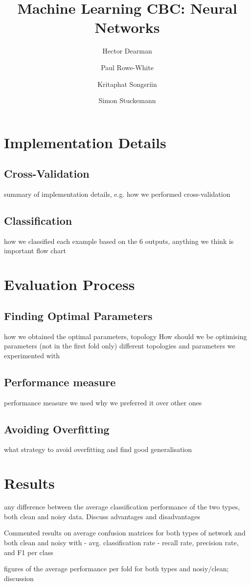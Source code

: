 \documentclass[10pt,a4paper]{article}
\author{Hector Dearman \and Paul Rowe-White \and Kritaphat Songsriin \and Simon Stuckemann}
\title{Machine Learning CBC: Neural Networks}
\begin{document}
\maketitle
\section{Implementation Details}
\subsection{Cross-Validation}
summary of implementation details, e.g. how we performed cross-validation
\subsection{Classification}
how we classified each example based on the 6 outputs, anything we think is important
flow chart

\section{Evaluation Process}

\subsection{Finding Optimal Parameters}
how we obtained the optimal parameters, topology
How should we be optimising parameters (not in the first fold only)
different topologies and parameters we experimented with
\subsection{Performance measure}
performance measure we used why we preferred it over other ones
\subsection{Avoiding Overfitting}
what strategy to avoid overfitting and find good generalisation

\section{Results}

any difference between the average classification performance of the two types, both clean and noisy data. Discuss advantages and disadvantages

Commented results on average confusion matrices for both types of network and both clean and noisy with 
	- avg. classification rate
	- recall rate, precision rate, and F1 per class

figures of the average performance per fold for both types and nosiy/clean; discussion
\end{document}
